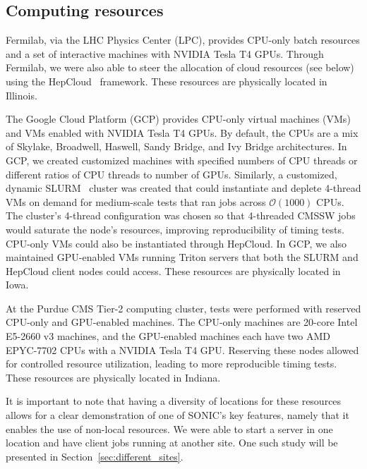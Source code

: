 
\subsection{Computing resources}

Fermilab, via the LHC Physics Center (LPC), provides CPU-only batch resources and a set of interactive machines with NVIDIA Tesla T4 GPUs. Through Fermilab, we were also able to steer the allocation of cloud resources (see below) using the HepCloud~\cite{Holzman:2017jgg} framework. These resources are physically located in Illinois.

The Google Cloud Platform (GCP) provides CPU-only virtual machines (VMs) and VMs enabled with NVIDIA Tesla T4 GPUs. By default, the CPUs are a mix of Skylake, Broadwell, Haswell, Sandy Bridge, and Ivy Bridge architectures. In GCP, we created customized machines with specified numbers of CPU threads or different ratios of CPU threads to number of GPUs. Similarly, a customized, dynamic SLURM~\cite{slurm} cluster was created that could instantiate and deplete 4-thread VMs on demand for medium-scale tests that ran jobs across $\mathcal{O}(1000)$ CPUs. The cluster's 4-thread configuration was chosen so that 4-threaded CMSSW jobs would saturate the node's resources, improving reproducibility of timing tests. CPU-only VMs could also be instantiated through HepCloud. In GCP, we also maintained GPU-enabled VMs running Triton servers that both the SLURM and HepCloud client nodes could access. These resources are physically located in Iowa.

At the Purdue CMS Tier-2 computing cluster, tests were performed with reserved CPU-only and GPU-enabled machines. The CPU-only machines are 20-core Intel E5-2660 v3 machines, and the GPU-enabled machines each have two AMD EPYC-7702 CPUs with a NVIDIA Tesla T4 GPU. Reserving these nodes allowed for controlled resource utilization, leading to more reproducible timing tests. These resources are physically located in Indiana.

It is important to note that having a diversity of locations for these resources allows for a clear demonstration of one of SONIC's key features, namely that it enables the use of non-local resources. We were able to start a server in one location and have client jobs running at another site. One such study will be presented in Section~\ref{sec:different_sites}.

